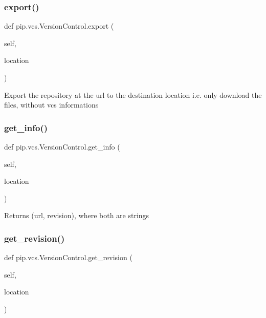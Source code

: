 \subsubsection{\texorpdfstring{export()}{export()}}
{\footnotesize\ttfamily def pip.\+vcs.\+Version\+Control.\+export (\begin{DoxyParamCaption}\item[{}]{self,  }\item[{}]{location }\end{DoxyParamCaption})}

\begin{DoxyVerb}Export the repository at the url to the destination location
i.e. only download the files, without vcs informations
\end{DoxyVerb}
 \mbox{\label{classpip_1_1vcs_1_1_version_control_a3152fffa744da2879caa9c61cee6adad}} 
\subsubsection{\texorpdfstring{get\+\_\+info()}{get\_info()}}
{\footnotesize\ttfamily def pip.\+vcs.\+Version\+Control.\+get\+\_\+info (\begin{DoxyParamCaption}\item[{}]{self,  }\item[{}]{location }\end{DoxyParamCaption})}

\begin{DoxyVerb}Returns (url, revision), where both are strings
\end{DoxyVerb}
 \mbox{\label{classpip_1_1vcs_1_1_version_control_a59243c7bceb232201184a0d394e67ff7}} 
\subsubsection{\texorpdfstring{get\+\_\+revision()}{get\_revision()}}
{\footnotesize\ttfamily def pip.\+vcs.\+Version\+Control.\+get\+\_\+revision (\begin{DoxyParamCaption}\item[{}]{self,  }\item[{}]{location }\end{DoxyParamCaption})}

